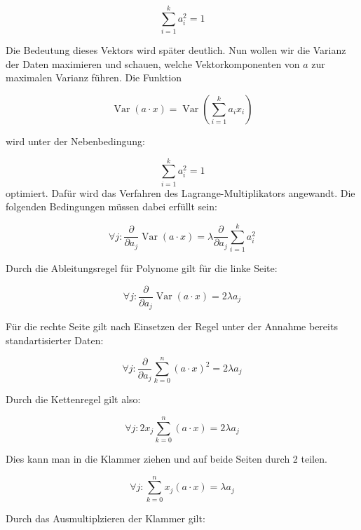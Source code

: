 \documentclass[11pt]{article} %
\DeclareMathOperator{\Var}{Var}
\begin{document}
\begin{equation}
\sum_{i = 1}^k a_i^2 = 1
\end{equation}

Die Bedeutung dieses Vektors wird später deutlich. Nun wollen wir die Varianz der Daten maximieren und schauen, welche Vektorkomponenten von $a$ zur maximalen Varianz führen. Die Funktion 

\begin{equation}
\Var(a \cdot x) = \Var( \sum_{i = 1}^k a_i x_i)
\end{equation}

wird unter der Nebenbedingung:

\begin{equation}
\sum_{i = 1}^k a_i^2 = 1
\end{equation}
optimiert. Dafür wird das Verfahren des Lagrange-Multiplikators angewandt. Die folgenden Bedingungen müssen dabei erfüllt sein:

\begin{equation}
\forall j : \frac{\partial}{\partial a_j} \Var(a \cdot x) = \lambda \frac{\partial}{\partial a_j} \sum_{i = 1}^k a_i^2 
\end{equation}

Durch die Ableitungsregel für Polynome gilt für die linke Seite:

\begin{equation}
\forall j : \frac{\partial}{\partial a_j} \Var(a \cdot x) = 2 \lambda a_j 
\end{equation}

Für die rechte Seite gilt nach Einsetzen der Regel unter der Annahme bereits standartisierter Daten:

\begin{equation}
\forall j : \frac{\partial}{\partial a_j} \sum_{k=0}^n (a \cdot x)^2 = 2 \lambda a_j 
\end{equation}

Durch die Kettenregel gilt also:

\begin{equation}
\forall j : 2 x_j \sum_{k=0}^n (a \cdot x) = 2 \lambda a_j 
\end{equation}

Dies kann man in die Klammer ziehen und auf beide Seiten durch 2 teilen.

\begin{equation}
\forall j :  \sum_{k=0}^n x_j (a \cdot x) =  \lambda a_j 
\end{equation}

Durch das Ausmultiplzieren der Klammer gilt:
\end{document}
